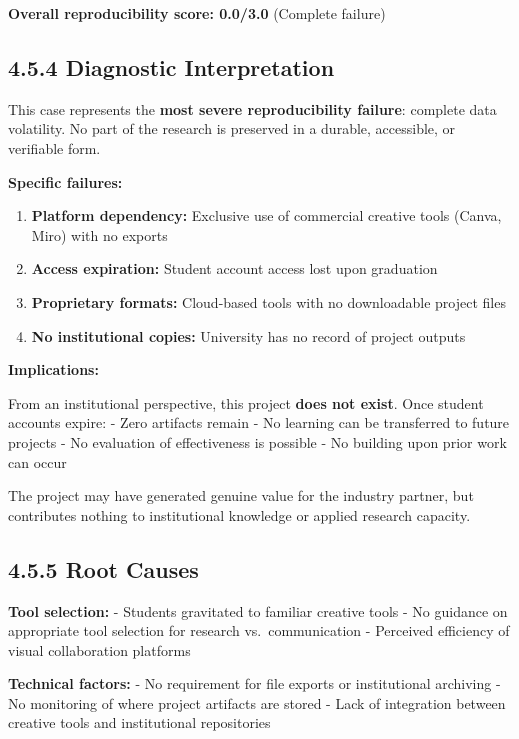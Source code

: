 \documentclass[
  oneside,
  open=any]{scrbook}
\providecommand{\tightlist}{%
  \setlength{\itemsep}{0pt}\setlength{\parskip}{0pt}}\usepackage{longtable,booktabs,array}
\begin{document}
\textbf{Overall reproducibility score: 0.0/3.0} (Complete failure)

\subsection{4.5.4 Diagnostic
Interpretation}\label{diagnostic-interpretation-3}

This case represents the \textbf{most severe reproducibility failure}:
complete data volatility. No part of the research is preserved in a
durable, accessible, or verifiable form.

\textbf{Specific failures:}

\begin{enumerate}
\def\labelenumi{\arabic{enumi}.}
\tightlist
\item
  \textbf{Platform dependency:} Exclusive use of commercial creative
  tools (Canva, Miro) with no exports
\item
  \textbf{Access expiration:} Student account access lost upon
  graduation
\item
  \textbf{Proprietary formats:} Cloud-based tools with no downloadable
  project files
\item
  \textbf{No institutional copies:} University has no record of project
  outputs
\end{enumerate}

\textbf{Implications:}

From an institutional perspective, this project \textbf{does not exist}.
Once student accounts expire: - Zero artifacts remain - No learning can
be transferred to future projects - No evaluation of effectiveness is
possible - No building upon prior work can occur

The project may have generated genuine value for the industry partner,
but contributes nothing to institutional knowledge or applied research
capacity.

\subsection{4.5.5 Root Causes}\label{root-causes-3}

\textbf{Tool selection:} - Students gravitated to familiar creative
tools - No guidance on appropriate tool selection for research
vs.~communication - Perceived efficiency of visual collaboration
platforms

\textbf{Technical factors:} - No requirement for file exports or
institutional archiving - No monitoring of where project artifacts are
stored - Lack of integration between creative tools and institutional
repositories
\end{document}
